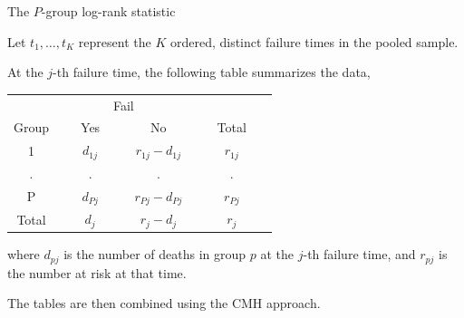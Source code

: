 \documentclass[ignorenonframetext,]{beamer}
\begin{document}
\begin{frame}{%
\protect\hypertarget{the-p-group-log-rank-statistic}{%
The \(P\)-group log-rank statistic}}

Let \(t_1, \ldots, t_K\) represent the \(K\) ordered, distinct failure
times in the pooled sample.

At the \(j\)-th failure time, the following table summarizes the data,

\begin{center}
\begin{tabular}{cccc}
\hline \hline
& \multicolumn{2}{c}{Fail} & \\ \cline{2-3}
\multicolumn{1}{c}{Group } & ~~~Yes~~~ & ~~~No~~~ & ~~~Total~~~\\ \hline
1 &  $d_{1j}$  & $r_{1j} - d_{1j}$ & $r_{1j}$ \\[2ex]
. &    .       &     .             &       .    \\[2ex]
P & $d_{Pj}$   & $r_{Pj} - d_{Pj}$ & $r_{Pj}$  \\ \hline
Total &  $d_j  $ & $r_j - d_j  $ & $r_j  $  \\ \hline \hline
\end{tabular}
\end{center}

where \(d_{pj}\) is the number of deaths in group \(p\) at the \(j\)-th
failure time, and \(r_{pj}\) is the number at risk at that time.

The tables are then combined using the CMH approach.

\end{frame}
\end{document}

